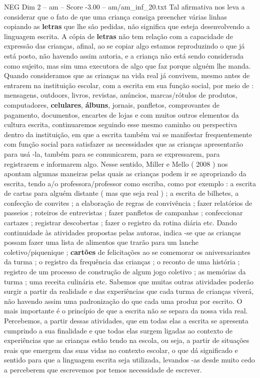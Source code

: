 \begin{textsample}{NEG Dim 2 – am – Score -3.00 – am/am\_inf\_20.txt}
Tal afirmativa nos leva a considerar que o fato de que uma criança consiga preencher várias linhas copiando as \textbf{letras} que lhe são pedidas, não significa que esteja desenvolvendo a linguagem escrita.
A cópia de \textbf{letras} não tem relação com a capacidade de expressão das crianças, afinal, ao se copiar algo estamos reproduzindo o que já está posto, não havendo assim autoria, e a criança não está sendo considerada como sujeito, mas sim uma executora de algo que faz porque alguém lhe manda.
Quando consideramos que as crianças na vida real já convivem, mesmo antes de entrarem na instituição escolar, com a escrita em sua função social, por meio de : mensagens, outdoors, livros, revistas, anúncios, marcas/rótulos de produtos, computadores, \textbf{celulares}, \textbf{álbuns}, jornais, panfletos, comprovantes de pagamento, documentos, encartes de lojas e com muitos outros elementos da cultura escrita, continuaremos seguindo esse mesmo caminho ou perspectiva dentro da instituição, em que a escrita também vai se manifestar frequentemente com função social para satisfazer as necessidades que as crianças apresentarão para usá -la, também para se comunicarem, para se expressarem, para registrarem e informarem algo.
Nesse sentido, Miller e Mello ( 2008 ) nos apontam algumas maneiras pelas quais as crianças podem ir se apropriando da escrita, tendo a/o professora/professor como escriba, como por exemplo : a escrita de cartas para alguém distante ( mas que seja real ) ; a escrita de bilhetes, a confecção de convites ; a elaboração de regras de convivência ; fazer relatórios de passeios ; roteiros de entrevistas ; fazer panfletos de campanhas ; confeccionar cartazes ; registrar descobertas ; fazer o registro da rotina diária etc.
Dando continuidade às atividades propostas pelas autoras, indica -se que as crianças possam fazer uma lista de alimentos que trarão para um lanche coletivo/piquenique ; \textbf{cartões} de felicitações ao se comemorar os aniversariantes da turma ; o registro da frequência das crianças ; o reconto de uma história ; registro de um processo de construção de algum jogo coletivo ; as memórias da turma ; uma receita culinária etc.
Sabemos que muitas outras atividades poderão surgir a partir da realidade e das experiências que cada turma de crianças viverá, não havendo assim uma padronização do que cada uma produz por escrito.
O mais importante é o princípio de que a escrita não se separa da nossa vida real.
Percebemos, a partir dessas atividades, que em todas elas a escrita se apresenta cumprindo a sua finalidade e que todas elas surgem ligadas ao contexto de experiências que as crianças estão tendo na escola, ou seja, a partir de situações reais que emergem das suas vidas no contexto escolar, o que dá significado e sentido para que a linguagem escrita seja utilizada, levandos -as desde muito cedo a perceberem que escrevemos por temos necessidade de escrever.

\end{textsample}
